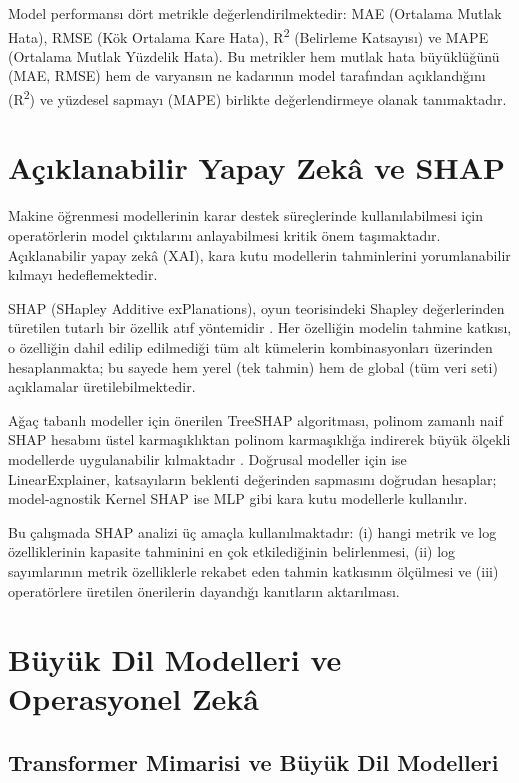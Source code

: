 Model performansı dört metrikle değerlendirilmektedir: MAE (Ortalama Mutlak Hata), RMSE (Kök Ortalama Kare Hata), R\textsuperscript{2} (Belirleme Katsayısı) ve MAPE (Ortalama Mutlak Yüzdelik Hata).
Bu metrikler hem mutlak hata büyüklüğünü (MAE, RMSE) hem de varyansın ne kadarının model tarafından açıklandığını (R\textsuperscript{2}) ve yüzdesel sapmayı (MAPE) birlikte değerlendirmeye olanak tanımaktadır.


\section{Açıklanabilir Yapay Zekâ ve SHAP}

Makine öğrenmesi modellerinin karar destek süreçlerinde kullanılabilmesi için operatörlerin model çıktılarını anlayabilmesi kritik önem taşımaktadır.
Açıklanabilir yapay zekâ (XAI), kara kutu modellerin tahminlerini yorumlanabilir kılmayı hedeflemektedir.

SHAP (SHapley Additive exPlanations), oyun teorisindeki Shapley değerlerinden türetilen tutarlı bir özellik atıf yöntemidir \autocite{lundberg2017}.
Her özelliğin modelin tahmine katkısı, o özelliğin dahil edilip edilmediği tüm alt kümelerin kombinasyonları üzerinden hesaplanmakta; bu sayede hem yerel (tek tahmin) hem de global (tüm veri seti) açıklamalar üretilebilmektedir.

Ağaç tabanlı modeller için önerilen TreeSHAP algoritması, polinom zamanlı naif SHAP hesabını üstel karmaşıklıktan polinom karmaşıklığa indirerek büyük ölçekli modellerde uygulanabilir kılmaktadır \autocite{lundberg2020}.
Doğrusal modeller için ise LinearExplainer, katsayıların beklenti değerinden sapmasını doğrudan hesaplar; model-agnostik Kernel SHAP ise MLP gibi kara kutu modellerle kullanılır.

Bu çalışmada SHAP analizi üç amaçla kullanılmaktadır:
(i) hangi metrik ve log özelliklerinin kapasite tahminini en çok etkilediğinin belirlenmesi,
(ii) log sayımlarının metrik özelliklerle rekabet eden tahmin katkısının ölçülmesi ve
(iii) operatörlere üretilen önerilerin dayandığı kanıtların aktarılması.


\section{Büyük Dil Modelleri ve Operasyonel Zekâ}
\label{sec:llm}

\subsection{Transformer Mimarisi ve Büyük Dil Modelleri}

